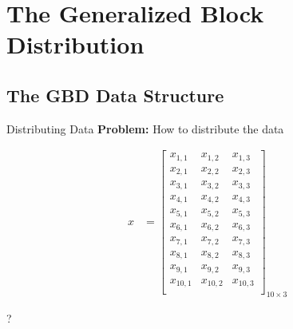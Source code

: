 \section[GBD]{The Generalized Block Distribution}
\makesubcontentsslides


\subsection{The GBD Data Structure}


\begin{frame}
  \begin{block}{Distributing Data}
  \centering
\textbf{Problem:}  How to distribute the data
\begin{center}
    \begin{minipage}{0.47\textwidth}
     \begin{center}
      \begin{align*}
      x &= \left[
            \begin{array}{lll}
            x_{1,1} & x_{1,2} & x_{1,3} \\
            x_{2,1} & x_{2,2} & x_{2,3} \\
            x_{3,1} & x_{3,2} & x_{3,3} \\
            x_{4,1} & x_{4,2} & x_{4,3} \\
            x_{5,1} & x_{5,2} & x_{5,3} \\
            x_{6,1} & x_{6,2} & x_{6,3} \\
            x_{7,1} & x_{7,2} & x_{7,3} \\
            x_{8,1} & x_{8,2} & x_{8,3} \\
            x_{9,1} & x_{9,2} & x_{9,3} \\
            x_{10,1} & x_{10,2} & x_{10,3} \\
            \end{array}
      \right]_{10\times 3}
      \end{align*}
     \end{center}
    \end{minipage}
    \begin{minipage}{0.47\textwidth}
    \centering
      {\fontsize{12cm}{1cm}\selectfont ? }
    \end{minipage}
    \end{center}
  \end{block}
\end{frame}




